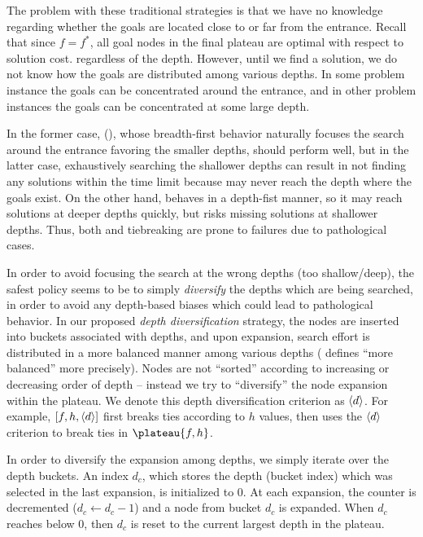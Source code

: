 The problem with these traditional strategies is that we have no knowledge
regarding whether the goals are located close to or far from the entrance. Recall
that since $f=f^*$, all goal nodes in the final plateau are optimal with respect to solution cost.
regardless of the depth.%
However, until we find a
solution, we do not know how the goals are distributed among various
depths. In some problem instance the goals can be concentrated around
the entrance, and in other problem instances the goals can be
concentrated at some large depth. %

In the former case, (\fifo), whose breadth-first behavior naturally
focuses the search around the entrance favoring the smaller depths,
should perform well, but in the latter case, exhaustively searching
the shallower depths can result in not finding any solutions within
the time limit because \fifo may never reach the depth where the goals
exist.  On the other hand, \lifo behaves in a depth-fist manner, so it
may reach solutions at deeper depths quickly, but risks missing
solutions at shallower depths.  Thus, both \fifo and \lifo tiebreaking
are prone to failures due to pathological cases.

In order to avoid focusing the search at the wrong depths (too shallow/deep), 
the safest policy seems to be to simply \emph{diversify} the depths which are being searched,
in order to avoid any depth-based biases which could lead to pathological behavior.
In our proposed \emph{depth diversification} strategy, the nodes are inserted into buckets
associated with depths, and upon expansion, search effort is distributed in a more balanced manner
among various depths ( defines ``more balanced''  more precisely).
Nodes are not  ``sorted''
according to increasing or decreasing order of depth -- instead we try to 
``diversify'' the node expansion within the plateau.
We denote this depth diversification criterion as ${\left<d\right>}$. 
For example, $[f,h,{\left<d\right>}]$ first breaks ties according to $h$ values,
then uses the ${\left<d\right>}$ criterion to break ties in $\plateau{f,h}$.

In order to diversify the expansion among depths, we simply
iterate over the depth buckets. An index $d_c$,
 which stores the depth (bucket index)  which was selected in the last expansion,
is initialized to 0.
At each expansion, the counter is decremented ($d_c\leftarrow d_c-1$) and
a node from  bucket $d_c$ is expanded. When $d_c$ reaches below 0, then $d_c$
is reset to the current largest depth in the plateau.

